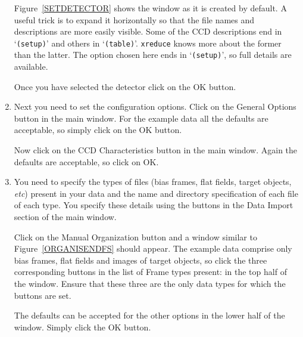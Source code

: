 \documentclass[twoside,11pt]{starlink}
\begin{document}
\begin{enumerate}
   Figure~\ref{SETDETECTOR} shows the window as it is created by default.
   A useful trick is to expand it horizontally so that the file names and
   descriptions are more easily visible.  Some of the CCD descriptions
   end in `\texttt{(setup)}' and others in `\texttt{(table)}'.  \texttt{xreduce}
   knows more about the former than the latter.  The option chosen here
   ends in `\texttt{(setup)}', so full details are available.

   Once you have selected the detector click on the \textsf{OK} button.

  \item Next you need to set the configuration options.  Click on the
   \textsf{General Options} button in the main window.  For the example
   data all the defaults are acceptable, so simply click on the \textsf{OK}
   button.

   Now click on the \textsf{CCD Characteristics} button in the main window.
   Again the defaults are acceptable, so click on \textsf{OK}.

  \item You need to specify the types of files (bias frames, flat fields,
   target objects, \emph{etc}) present in your data and the name and
   directory specification of each file of each type.  You specify these
   details using the buttons in the \textsf{Data Import} section of the
   main window.

   Click on the \textsf{Manual Organization} button and a window similar to
   Figure~\ref{ORGANISENDFS} should appear.  The example data comprise
   only bias frames, flat fields and images of target objects, so click
   the three corresponding buttons in the list of \textsf{Frame types
   present:} in the top half of the window.  Ensure that these three
   are the only data types for which the buttons are set.

   The defaults can be accepted for the other options in the lower half
   of the window.  Simply click the \textsf{OK} button.


\end{enumerate}
\end{document}
